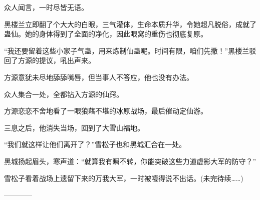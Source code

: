 \begin{this_body}
众人闻言，一时尽皆无语。

黑楼兰立即翻了个大大的白眼，三气灌体，生命本质升华，令她超凡脱俗，成就了蛊仙。她的身体得到了全面的净化，因此眼窝的重伤也彻底复原。

“我还要留着这些小家子气蛊，用来炼制仙蛊呢。时间有限，咱们先撤！”黑楼兰驳回了方源的提议，吼出声来。

方源意犹未尽地舔舔嘴唇，但当事人不答应，他也没有办法。

众人集合一处，全都钻入方源的仙窍。

方源恋恋不舍地看了一眼狼藉不堪的冰原战场，最后催动定仙游。

三息之后，他消失当场，回到了大雪山福地。

“我们就这样让他们离开了？”雪松子也和黑城汇合在一处。

黑城扬起眉头，寒声道：“就算我有瞬不转，你能突破这些力道虚影大军的防守？”

雪松子看着战场上遗留下来的万我大军，一时被噎得说不出话。(未完待续……)

------------

\end{this_body}

